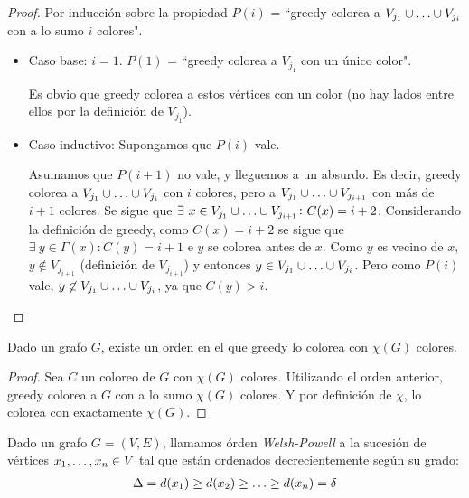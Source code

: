 \begin{proof}
Por inducción sobre la propiedad $P(i)$ = ``greedy colorea a $V_{j_1} \cup \mathellipsis \cup V_{j_i}$ con a lo sumo $i$ colores".
\begin{itemize}
    \item Caso base: $i = 1$. $P(1)$ = ``greedy colorea a $V_{j_1}$ con un único color".
    
    Es obvio que greedy colorea a estos vértices con un color (no hay lados entre ellos por la definición de $V_{j_1}$).
    
    \item Caso inductivo: Supongamos que $P(i)$ vale.
    
    Asumamos que $P(i+1)$ no vale, y lleguemos a un absurdo. Es decir, greedy colorea a $V_{j_1} \cup \mathellipsis \cup V_{j_i}$ con $i$ colores, pero a $V_{j_1} \cup \mathellipsis \cup V_{j_{i+1}}$ con más de $i + 1$ colores. Se sigue que $\exists~x \in V_{j_1} \cup \mathellipsis \cup V_{j_{i+1}}\colon C(x) = i + 2$. Considerando la definición de greedy, como $C(x) = i + 2$ se sigue que  $\exists~y \in \Gamma(x)\colon C(y) = i + 1$ e $y$ se colorea antes de $x$. Como $y$ es vecino de $x$, $y \not\in V_{j_{i+1}}$ (definición de $V_{j_{i+1}}$) y entonces $y \in V_{j_1} \cup \mathellipsis \cup V_{j_i}$. Pero como $P(i)$ vale, $y \not\in V_{j_1} \cup \mathellipsis \cup V_{j_i}$, ya que $C(y) > i$.
 \end{itemize}
\end{proof}

\begin{corollary}
Dado un grafo $G$, existe un orden en el que greedy lo colorea con $\chi(G)$ colores.
\end{corollary}
\begin{proof}
Sea $C$ un coloreo de $G$ con $\chi(G)$ colores. Utilizando el orden anterior, greedy colorea a $G$ con a lo sumo $\chi(G)$ colores. Y por definición de $\chi$, lo colorea con exactamente $\chi(G)$.
\end{proof}

\begin{definition}
Dado un grafo $G=(V,E)$, llamamos órden \emph{Welsh-Powell} a la sucesión de vértices $x_1, \mathellipsis, x_n \in V$ tal que están ordenados decrecientemente según su grado:
\begin{align}
    \Delta = d(x_1) \ge d(x_2) \ge \mathellipsis \ge d(x_n) = \delta
\end{align}
\end{definition}


